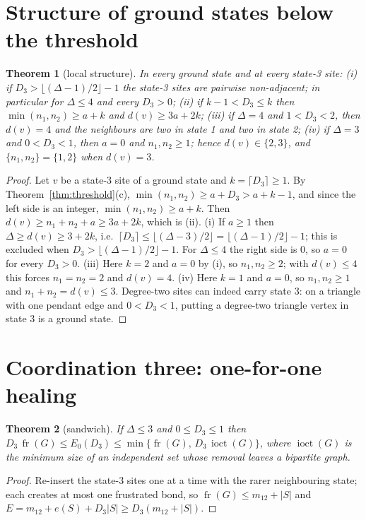 \documentclass[aps,pre,twocolumn,floatfix,10pt]{revtex4-2}
\newtheorem{theorem}{Theorem}
\theoremstyle{definition}
\theoremstyle{remark}
\newcommand{\fr}{\operatorname{fr}}
\newcommand{\ioct}{\operatorname{ioct}}
\newcommand{\OPT}{E_0}
\begin{document}
\section{Structure of ground states below the threshold}
\label{sec:structure}
\begin{theorem}[local structure]\label{thm:local}
In every ground state and at every state-3 site:
(i) if $D_3>\lfloor(\Delta-1)/2\rfloor-1$ the state-3 sites are pairwise non-adjacent; in
particular for $\Delta\le4$ and every $D_3>0$;
(ii) if $k-1<D_3\le k$ then $\min(n_1,n_2)\ge a+k$ and $d(v)\ge 3a+2k$;
(iii) if $\Delta=4$ and $1<D_3<2$, then $d(v)=4$ and the neighbours are two in state 1 and two
in state 2;
(iv) if $\Delta=3$ and $0<D_3<1$, then $a=0$ and $n_1,n_2\ge1$; hence $d(v)\in\{2,3\}$, and
$\{n_1,n_2\}=\{1,2\}$ when $d(v)=3$.
\end{theorem}
\begin{proof}
Let $v$ be a state-3 site of a ground state and $k=\lceil D_3\rceil\ge1$. By
Theorem~\ref{thm:threshold}(c), $\min(n_1,n_2)\ge a+D_3>a+k-1$, and since the left side is an
integer, $\min(n_1,n_2)\ge a+k$. Then $d(v)\ge n_1+n_2+a\ge 3a+2k$, which is (ii).
(i) If $a\ge1$ then $\Delta\ge d(v)\ge3+2k$, i.e.\ $\lceil D_3\rceil\le\lfloor(\Delta-3)/2\rfloor
=\lfloor(\Delta-1)/2\rfloor-1$; this is excluded when $D_3>\lfloor(\Delta-1)/2\rfloor-1$. For
$\Delta\le4$ the right side is $0$, so $a=0$ for every $D_3>0$.
(iii) Here $k=2$ and $a=0$ by (i), so $n_1,n_2\ge2$; with $d(v)\le4$ this forces $n_1=n_2=2$ and
$d(v)=4$.
(iv) Here $k=1$ and $a=0$, so $n_1,n_2\ge1$ and $n_1+n_2=d(v)\le3$.
Degree-two sites can indeed carry state 3: on a triangle with one pendant edge and
$0<D_3<1$, putting a degree-two triangle vertex in state 3 is a ground state.
\end{proof}

\section{Coordination three: one-for-one healing}
\label{sec:healing}
\begin{theorem}[sandwich]\label{thm:sandwich}
If $\Delta\le3$ and $0\le D_3\le1$ then
$D_3\,\fr(G)\le\OPT(D_3)\le\min\{\fr(G),\,D_3\,\ioct(G)\}$, where $\ioct(G)$ is the minimum
size of an independent set whose removal leaves a bipartite graph.
\end{theorem}
\begin{proof}
Re-insert the state-3 sites one at a time with the rarer neighbouring state; each creates at
most one frustrated bond, so $\fr(G)\le m_{12}+|S|$ and
$E=m_{12}+e(S)+D_3|S|\ge D_3(m_{12}+|S|)$.
\end{proof}
\end{document}
